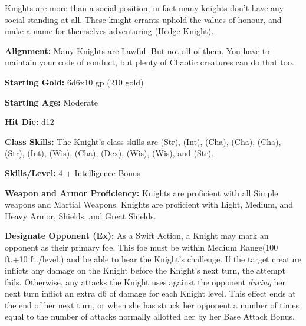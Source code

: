 
Knights are more than a social position, in fact many knights don't have any social standing at all. These knight errants uphold the values of honour, and make a name for themselves adventuring (Hedge Knight).

\textbf{Alignment:} Many Knights are Lawful. But not all of them. You have to maintain your code of conduct, but plenty of Chaotic creatures can do that too.

\textbf{Starting Gold:} 6d6x10 gp (210 gold)

\textbf{Starting Age:} Moderate

\textbf{Hit Die:} d12

\textbf{Class Skills:} The Knight's class skills are  (Str),  (Int),  (Cha),  (Cha),  (Cha),  (Str),  (Int),  (Wis),   (Cha),  (Dex),  (Wis),  (Wis), and  (Str).

\textbf{Skills/Level:} 4 + Intelligence Bonus

\goodbab{}
\poorfor{}
\poorref{}
\goodwil{}

\begin{classtable}
\end{classtable}

\classfeatures

\textbf{Weapon and Armor Proficiency:} Knights are proficient with all Simple weapons and Martial Weapons. Knights are proficient with Light, Medium, and Heavy Armor, Shields, and Great Shields.

\textbf{Designate Opponent (Ex):} As a Swift Action, a Knight may mark an opponent as their primary foe. This foe must be within Medium Range(100 ft.+10 ft./level.) and be able to hear the Knight's challenge. If the target creature inflicts any damage on the Knight before the Knight's next turn, the attempt fails. Otherwise, any attacks the Knight uses against the opponent \textit{during} her next turn inflict an extra d6 of damage for each Knight level. This effect ends at the end of her next turn, or when she has struck her opponent a number of times equal to the number of attacks normally allotted her by her Base Attack Bonus.


